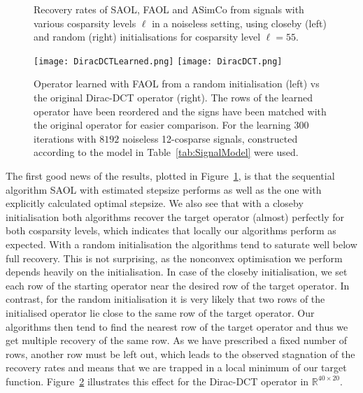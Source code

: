 \documentclass[11pt, onecolumn, journal,compsoc]{IEEEtran}
\newcommand{\R}{{\mathbb{R}}}
\theoremstyle{plain}
\theoremstyle{remark}
\begin{document}
\begin{figure}
	\caption{Recovery rates of SAOL, FAOL and ASimCo from signals with various cosparsity levels $\ell$ in a noiseless setting, using closeby (left) and random (right) initialisations for cosparsity level $\ell =55$.}
	\label{fig:StupidNoisefree}
\end{figure}
%
\begin{figure}
	\centering
	\texttt{[image: DiracDCTLearned.png]}
	\quad
	\texttt{[image: DiracDCT.png]}
	\caption{Operator learned with FAOL from a random initialisation (left) vs the original Dirac-DCT operator (right). The rows of the learned operator have been reordered and the signs have been matched with the original operator for easier comparison. For the learning $300$ iterations with $8192$ noiseless 12-cosparse signals, constructed according to the model in Table~\ref{tab:SignalModel} were used.}
	\label{fig:MultipleRecovery}
\end{figure}
%
The first good news of the results, plotted in Figure~\ref{fig:StupidNoisefree}, is that the sequential algorithm SAOL with estimated stepsize performs as well as the one with explicitly calculated optimal stepsize. We also see
that with a closeby initialisation both algorithms recover the target operator (almost) perfectly for both cosparsity levels, which indicates that locally our algorithms perform as expected.
With a random initialisation the algorithms tend to saturate well below full recovery. This is not surprising, as the nonconvex optimisation we perform depends heavily on the initialisation. In case of the closeby initialisation, we set each row of the starting operator near the desired row of the target operator. In contrast, for the random initialisation it is very likely that two rows of the initialised operator lie close to the same row of the target operator. Our algorithms then tend to find the nearest row of the target operator and thus we get multiple recovery of the same row. As we have prescribed a fixed number of rows, another row must be left out, which leads to the observed stagnation of the recovery rates and means that we are trapped in a local minimum of our target function. Figure~\ref{fig:MultipleRecovery} illustrates this effect for the Dirac-DCT operator in $\R^{40\times 20}$. \\
\end{document}
